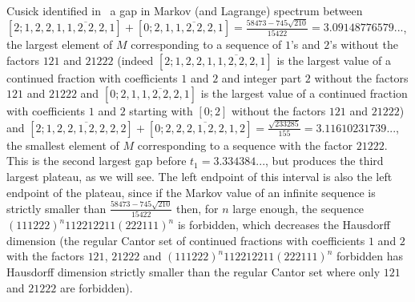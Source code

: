 \documentclass[10pt]{amsart}
\numberwithin{equation}{section}
\theoremstyle{definition}
\begin{document}
Cusick identified in~\cite{C74} a gap in Markov (and Lagrange) spectrum between
$[2;1,2,2,\overline{1,1,2,2,2,1}]+[0;2,
\overline{1,1,2,2,2,1}]=\frac{58473-745\sqrt{210}}{15422}=3.09148776579...$, the
largest element of $M$ corresponding to a sequence of $1$'s and $2$'s without
the factors $121$ and $21222$ (indeed $[2;1,2,2,\overline{1,1,2,2,2,1}]$ is the
largest value of a continued fraction with coefficients $1$ and $2$ and integer
part $2$ without the factors $121$ and $21222$ and
$[0;2,\overline{1,1,2,2,2,1}]$ is the largest value of a continued fraction with
coefficients $1$ and $2$ starting with $[0;2]$ without the factors $121$ and
$21222$) and $[2;
\overline{1,2,2,1,2,2,2,2}]+[0;\overline{2,2,2,1,2,2,1,2}]=\frac{\sqrt{233285}}{155}=3.11610231739...$,
the smallest element of $M$ corresponding to a sequence with the factor $21222$.
This is the second largest gap before $t_1=3.334384...$, but produces the third
largest plateau, as we will see. The left endpoint of this interval is also the
left endpoint of the plateau, since if the Markov value of an infinite sequence
is strictly smaller than $\frac{58473-745\sqrt{210}}{15422}$ then, for $n$ large
enough, the sequence $(111222)^n 112212211(222111)^n$ is forbidden, which
decreases the Hausdorff dimension (the regular Cantor set of continued fractions
with coefficients $1$ and $2$ with the factors $121$, $21222$ and $(111222)^n
112212211(222111)^n$ forbidden has Hausdorff dimension strictly smaller than the
regular Cantor set where only $121$ and $21222$ are forbidden). 
\end{document}
